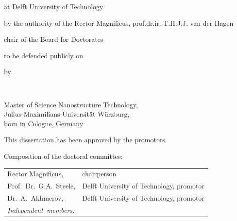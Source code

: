 \begin{titlepage}
\begin{center}
at Delft University of Technology

by the authority of the Rector Magnificus, prof.dr.ir. T.H.J.J. van der Hagen

chair of the Board for Doctorates

to be defended publicly on


\bigskip
\bigskip

by

\bigskip
\bigskip

\makeatletter
{\Large\titlefont\bfseries\@firstname\ {\titleshape\@lastname}}
\makeatother

\bigskip
\bigskip

Master of Science Nanostructure Technology, \\
Julius-Maximilians-Universität Würzburg, \\
born in Cologne, Germany

\vspace*{2\bigskipamount}

\end{center}

\clearpage
\thispagestyle{empty}

\noindent This dissertation has been approved by the promotors.

\bigskip
\noindent Composition of the doctoral committee:

\medskip\noindent
\begin{tabular}{p{3.5cm}l}
    Rector Magnificus, & chairperson \\
    Prof.~Dr.~G.A.~Steele, & Delft University of Technology, promotor \\
    Dr.~A.~Akhmerov, & Delft University of Technology, promotor \\

    \medskip
    \mbox{\emph{Independent members:}} & \\





\end{tabular}
\end{titlepage}
